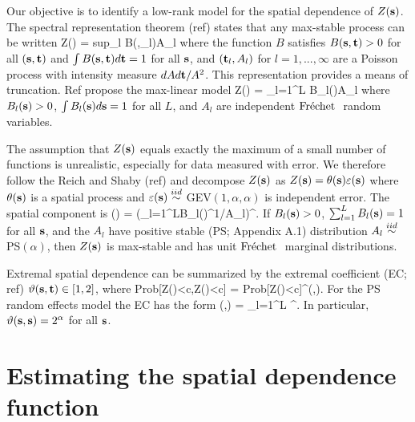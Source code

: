 \documentclass[11pt]{article}
\begin{document}
Our objective is to identify a low-rank model for the spatial dependence of $Z(\mbox{\bf s})$.
The spectral representation theorem (ref) states that any max-stable process can be written
\beq\label{spectral}
  Z(\bs) = \mbox{sup}_l B(\bs,\bt_l)A_{l}
\eeq
where the function $B$ satisfies $B(\mbox{\bf s},\mbox{\bf t})>0$ for all $(\mbox{\bf s},\mbox{\bf t})$ and $\int B(\mbox{\bf s},\mbox{\bf t})d\mbox{\bf t}=1$ for all $\mbox{\bf s}$, and $(\mbox{\bf t}_l,A_l)$ for $l=1,...,\infty$ are a Poisson process with intensity measure $dA d\mbox{\bf t}/A^2$.
This representation provides a means of truncation.
Ref propose the max-linear model
\beq\label{spectral}
Z(\bs) = \bigvee_{l=1}^L B_{l}(\bs)A_l
\eeq
where $B_{l}(\mbox{\bf s})>0$, $\int B_l(\mbox{\bf s})d\mbox{\bf s}=1$ for all $L$, and $A_l$ are independent $\mbox{Fr$\acute{\mbox{e}}$chet }$ random variables.


The assumption that $Z(\mbox{\bf s})$ equals exactly the maximum of a small number of functions is unrealistic, especially for data measured with error.
We therefore follow the Reich and Shaby (ref) and decompose  $Z(\mbox{\bf s})$ as $Z(\mbox{\bf s})=\theta(\mbox{\bf s})\varepsilon(\mbox{\bf s})$ where $\theta(\mbox{\bf s})$ is a spatial process and $\varepsilon(\mbox{\bf s})\stackrel{iid}{\sim}$ GEV$(1,\alpha,\alpha)$ is independent error.
The spatial component is
\beq \label{theta}
  \theta(\bs) = \left(\sum_{l=1}^LB_{l}(\bs)^{1/\alpha}A_{l}\right)^{\alpha}.
\eeq
If $B_{l}(\mbox{\bf s})>0$, $\sum_{l=1}^LB_{l}(\mbox{\bf s})=1$ for all $\mbox{\bf s}$, and the $A_{l}$ have positive stable (PS; Appendix A.1) distribution $A_{l}\stackrel{iid}{\sim}$ PS$(\alpha)$, then $Z(\mbox{\bf s})$ is max-stable and has unit $\mbox{Fr$\acute{\mbox{e}}$chet }$ marginal distributions.

Extremal spatial dependence can be summarized by the extremal coefficient (EC; ref) $\vartheta(\mbox{\bf s},\mbox{\bf t})\in[1,2]$, where
\beq\label{ECdev}
  \mbox{Prob}[Z(\bs)<c,Z(\bt)<c] = \mbox{Prob}[Z(\bs)<c]^{\vartheta(\bs,\bt)}.
\eeq
For the PS random effects model the EC has the form
\beq\label{EC}
   \vartheta(\bs,\bt) = \sum_{l=1}^L ^\alpha.
\eeq
In particular, $\vartheta(\mbox{\bf s},\mbox{\bf s}) = 2^{\alpha}$ for all $\mbox{\bf s}$.

\section{Estimating the spatial dependence function}\label{s:estimation}
\end{document}
